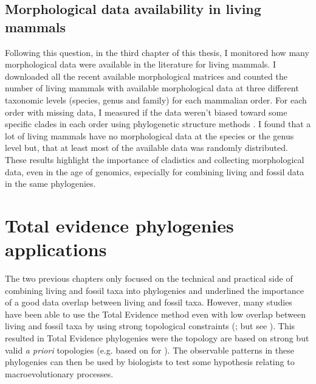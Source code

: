 \subsection{Morphological data availability in living mammals}
Following this question, in the third chapter of this thesis, I monitored how many morphological data were available in the literature for living mammals.
I downloaded all the recent available morphological matrices and counted the number of living mammals with available morphological data at three different taxonomic levels (species, genus and family) for each mammalian order.
For each order with missing data, I measured if the data weren't biased toward some specific clades in each order using phylogenetic structure methods \citep{webb2002phylogenies}.
I found that a lot of living mammals have no morphological data at the species or the genus level but, that at least most of the available data was randomly distributed.
These results highlight the importance of cladistics and collecting morphological data, even in the age of genomics, especially for combining living and fossil data in the same phylogenies.

\section{Total evidence phylogenies applications}
The two previous chapters only focused on the technical and practical side of combining living and fossil taxa into phylogenies and underlined the importance of a good data overlap between living and fossil taxa.
However, many studies have been able to use the Total Evidence method even with low overlap between living and fossil taxa by using strong topological constraints (\citealt{ronquista2012,schragocombining2013,slaterphylogenetic2013,beckancient2014}; but see \citealt{Arcila2015131,Dembo2015}).
This resulted in Total Evidence phylogenies were the topology are based on strong but valid \textit{a priori} topologies (e.g. based on \citealt{meredithimpacts2011} for \citealt{slaterphylogenetic2013}).
The observable patterns in these phylogenies can then be used by biologists to test some hypothesis relating to macroevolutionary processes.

